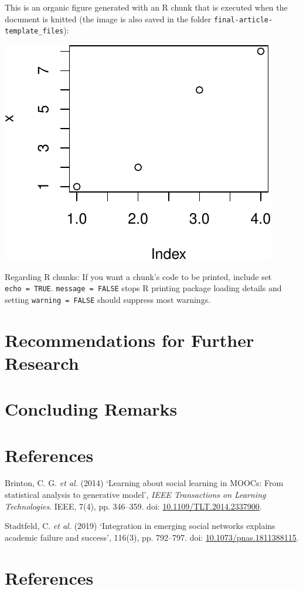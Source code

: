 \documentclass[11pt,preprint, authoryear]{article}
\numberwithin{equation}{section}
\numberwithin{figure}{section}
\numberwithin{table}{section}
\begin{document}
This is an organic figure generated with an R chunk that is executed
when the document is knitted (the image is also saved in the folder
\texttt{final-article-template\_files}):

\begin{center}\includegraphics[width=0.4\linewidth]{final-msc-article_files/figure-latex/unnamed-chunk-2-1} \end{center}

Regarding R chunks: If you want a chunk's code to be printed, include
set \texttt{echo\ =\ TRUE}. \texttt{message\ =\ FALSE} stops R printing
package loading details and setting \texttt{warning\ =\ FALSE} should
suppress most warnings.

\newpage

\section{\texorpdfstring{Recommendations for Further Research
\label{Recom}}{Recommendations for Further Research }}\label{recommendations-for-further-research}

\newpage

\section{\texorpdfstring{Concluding Remarks
\label{Concl}}{Concluding Remarks }}\label{concluding-remarks}

\newpage

\section{References}\label{references}

\hypertarget{refs}{}
\hypertarget{ref-Brinton2014}{}
Brinton, C. G. \emph{et al.} (2014) `Learning about social learning in
MOOCs: From statistical analysis to generative model', \emph{IEEE
Transactions on Learning Technologies}. IEEE, 7(4), pp. 346--359. doi:
\href{https://doi.org/10.1109/TLT.2014.2337900}{10.1109/TLT.2014.2337900}.

\hypertarget{ref-Stadtfeld2019}{}
Stadtfeld, C. \emph{et al.} (2019) `Integration in emerging social
networks explains academic failure and success', 116(3), pp. 792--797.
doi:
\href{https://doi.org/10.1073/pnas.1811388115}{10.1073/pnas.1811388115}.

\newcommand\wordcount{
    \immediate\write18{texcount -sub=section \jobname.tex  | grep "Section" |     sed -e 's/+.*//' | sed -n \thesection p > 'count.txt'}
(words)}

\section*{References}
\end{document}
